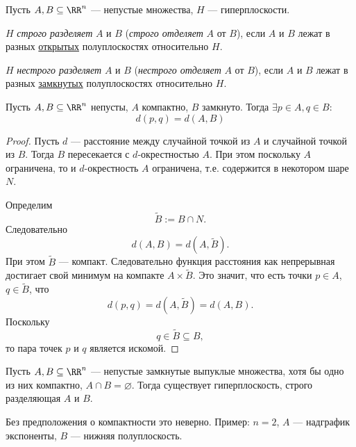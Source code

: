 \documentclass[12pt,a4paper]{article}
\begin{document}
    \begin{definition}
        Пусть $A, B \subseteq \RR^n$ --- непустые множества, $H$ --- гиперплоскости.

        $H$ \emph{строго разделяет} $A$ и $B$ (\emph{строго отделяет} $A$ от $B$), если $A$ и $B$ лежат в разных \underline{открытых} полуплоскостях относительно $H$.

        $H$ \emph{нестрого разделяет} $A$ и $B$ (\emph{нестрого отделяет} $A$ от $B$), если $A$ и $B$ лежат в разных \underline{замкнутых} полуплоскостях относительно $H$.
    \end{definition}

    \begin{lemma}\label{closed-and-compact-sets-distance-representatives-lemma}
        Пусть $A, B \subseteq \RR^n$ непусты, $A$ компактно, $B$ замкнуто. Тогда $\exists p \in A, q \in B:$
        \[d(p, q) = d(A, B)\]
    \end{lemma}

    \begin{proof}
        Пусть $d$ --- расстояние между случайной точкой из $A$ и случайной точкой из $B$. Тогда $B$ пересекается с $d$-окрестностью $A$. При этом поскольку $A$ ограничена, то и $d$-окрестность $A$ ограничена, т.е. содержится в некотором шаре $N$.
        
        Определим
        \[\widetilde{B} := B \cap N.\]
        Следовательно
        \[d(A, B) = d(A, \widetilde{B}).\]
        При этом $\widetilde{B}$ --- компакт. Следовательно функция расстояния как непрерывная достигает свой минимум на компакте $A \times \widetilde{B}$. Это значит, что есть точки $p \in A$, $q \in \widetilde{B}$, что
        \[d(p, q) = d(A, \widetilde{B}) = d(A, B).\]
        Поскольку
        \[q \in \widetilde{B} \subseteq B,\]
        то пара точек $p$ и $q$ является искомой.
    \end{proof}

    \begin{theorem}\label{strict-separability-theorem}
        Пусть $A, B \subseteq \RR^n$ --- непустые замкнутые выпуклые множества, хотя бы одно из них компактно, $A \cap B = \varnothing$. Тогда существует гиперплоскость, строго разделяющая $A$ и $B$.
    \end{theorem}

    \begin{remark}
        Без предположения о компактности это неверно. Пример: $n=2$, $A$ --- надграфик экспоненты, $B$ --- нижняя полуплоскость.
    \end{remark}
\end{document}
